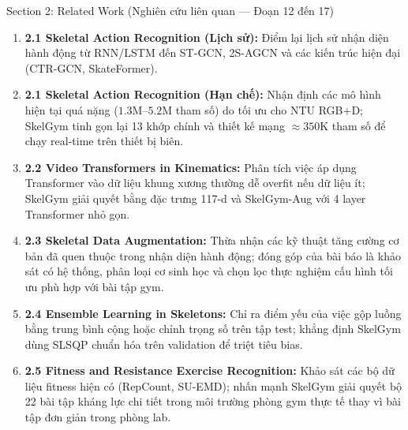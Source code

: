 \documentclass[10pt,a4paper]{article}
\begin{document}
\begin{secbox}{Section 2: Related Work (Nghiên cứu liên quan — Đoạn 12 đến 17)}
\begin{enumerate}[leftmargin=*, itemsep=2pt, topsep=1pt, start=12]
    \item \textbf{2.1 Skeletal Action Recognition (Lịch sử):} Điểm lại lịch sử nhận diện hành động từ RNN/LSTM đến ST-GCN, 2S-AGCN và các kiến trúc hiện đại (CTR-GCN, SkateFormer).
    \item \textbf{2.1 Skeletal Action Recognition (Hạn chế):} Nhận định các mô hình hiện tại quá nặng ($1.3\text{M}$--$5.2\text{M}$ tham số) do tối ưu cho NTU RGB+D; SkelGym tinh gọn lại 13 khớp chính và thiết kế mạng $\approx 350\text{K}$ tham số để chạy real-time trên thiết bị biên.
    \item \textbf{2.2 Video Transformers in Kinematics:} Phân tích việc áp dụng Transformer vào dữ liệu khung xương thường dễ overfit nếu dữ liệu ít; SkelGym giải quyết bằng đặc trưng 117-d và SkelGym-Aug với 4 layer Transformer nhỏ gọn.
    \item \textbf{2.3 Skeletal Data Augmentation:} Thừa nhận các kỹ thuật tăng cường cơ bản đã quen thuộc trong nhận diện hành động; đóng góp của bài báo là khảo sát có hệ thống, phân loại cơ sinh học và chọn lọc thực nghiệm cấu hình tối ưu phù hợp với bài tập gym.
    \item \textbf{2.4 Ensemble Learning in Skeletons:} Chỉ ra điểm yếu của việc gộp luồng bằng trung bình cộng hoặc chỉnh trọng số trên tập test; khẳng định SkelGym dùng SLSQP chuẩn hóa trên validation để triệt tiêu bias.
    \item \textbf{2.5 Fitness and Resistance Exercise Recognition:} Khảo sát các bộ dữ liệu fitness hiện có (RepCount, SU-EMD); nhấn mạnh SkelGym giải quyết bộ 22 bài tập kháng lực chi tiết trong môi trường phòng gym thực tế thay vì bài tập đơn giản trong phòng lab.
\end{enumerate}
\end{secbox}

\newpage
\end{document}
